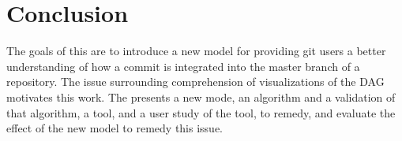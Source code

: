 \chapter{Conclusion}\label{chap:conclusion}

The goals of this \paper{} are to introduce a new model for providing
git users a better understanding of how a commit is integrated into the
master branch of a repository. The issue surrounding comprehension of
visualizations of the DAG motivates this work. The \paper{} presents a
new mode, an algorithm and a validation of that algorithm, a tool, and a
user study of the tool, to remedy, and evaluate the effect of the new
model to remedy this issue.
